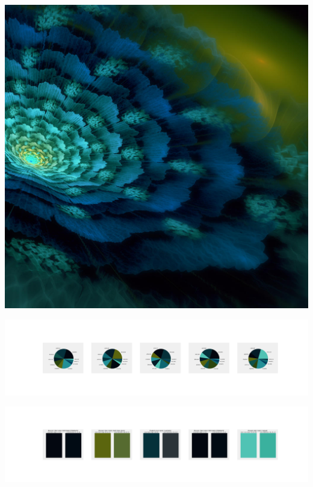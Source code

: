 \documentclass[11pt]{article}
\begin{document}
\begin{landscape}
    \begin{center}
    \includegraphics[width=\textwidth]{./nbimg/file (166).jpg}
    \end{center}

    \begin{center}
    \includegraphics[width=250mm]{./nbimg/pie-74.jpg}
    \end{center}

    \begin{center}
    \includegraphics[width=250mm]{./nbimg/peak-74.jpg}
    \end{center}
    


\end{landscape}
\end{document}
